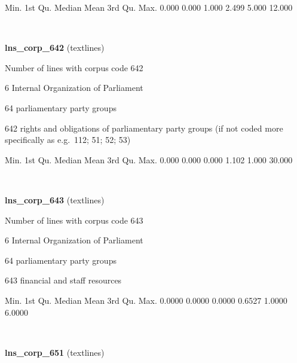 \documentclass[]{article}
\newenvironment{Shaded}{\begin{snugshade}}{\end{snugshade}}
\newcommand{\FloatTok}[1]{\textcolor[rgb]{0.00,0.00,0.81}{{#1}}}
\newcommand{\NormalTok}[1]{{#1}}
\begin{document}
\begin{Shaded}
\begin{Highlighting}[]
   \NormalTok{Min. 1st Qu.  Median    Mean 3rd Qu.    Max. }
  \FloatTok{0.000}   \FloatTok{0.000}   \FloatTok{1.000}   \FloatTok{2.499}   \FloatTok{5.000}  \FloatTok{12.000} 
\end{Highlighting}
\end{Shaded}

~

\vspace{1em}

\textbf{lns\_corp\_642} (textlines)

Number of lines with corpus code 642

6 Internal Organization of Parliament

64 parliamentary party groups

642 rights and obligations of parliamentary party groups (if not coded
more specifically as e.g.~112; 51; 52; 53)

\begin{Shaded}
\begin{Highlighting}[]
   \NormalTok{Min. 1st Qu.  Median    Mean 3rd Qu.    Max. }
  \FloatTok{0.000}   \FloatTok{0.000}   \FloatTok{0.000}   \FloatTok{1.102}   \FloatTok{1.000}  \FloatTok{30.000} 
\end{Highlighting}
\end{Shaded}

~

\vspace{1em}

\textbf{lns\_corp\_643} (textlines)

Number of lines with corpus code 643

6 Internal Organization of Parliament

64 parliamentary party groups

643 financial and staff resources

\begin{Shaded}
\begin{Highlighting}[]
   \NormalTok{Min. 1st Qu.  Median    Mean 3rd Qu.    Max. }
 \FloatTok{0.0000}  \FloatTok{0.0000}  \FloatTok{0.0000}  \FloatTok{0.6527}  \FloatTok{1.0000}  \FloatTok{6.0000} 
\end{Highlighting}
\end{Shaded}

~

\vspace{1em}

\textbf{lns\_corp\_651} (textlines)
\end{document}
